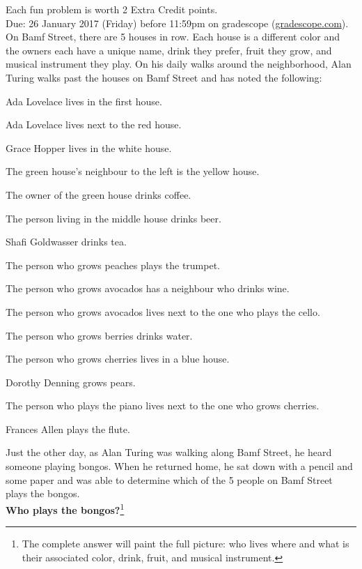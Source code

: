 \documentclass{article}
\theoremstyle{definition}
\begin{document}
\noindent
Each fun problem is worth 2 Extra Credit points.\\
Due: 26 January 2017 (Friday) before 11:59pm on gradescope (\url{gradescope.com}).\\

\noindent
On Bamf Street, there are 5 houses in row.  Each house is a different color and the owners each have a unique name, drink they prefer, fruit they grow, and musical instrument they play.  On his daily walks around the neighborhood, Alan Turing walks past the houses on Bamf Street and has noted the following:
\begin{compactitem}
\item Ada Lovelace lives in the first house.
\item Ada Lovelace lives next to the red house.
\item Grace Hopper lives in the white house.
\item The green house's neighbour to the left is the yellow house.
\item The owner of the green house drinks coffee.
\item The person living in the middle house drinks beer.
\item Shafi Goldwasser drinks tea.
\item The person who grows peaches plays the trumpet.
\item The person who grows avocados has a neighbour who drinks wine.
\item The person who grows avocados lives next to the one who plays the cello.
\item The person who grows berries drinks water.
\item The person who grows cherries lives in a blue house.
\item Dorothy Denning grows pears.
\item The person who plays the piano lives next to the one who grows cherries.
\item Frances Allen plays the flute.
\end{compactitem}
Just the other day, as Alan Turing was walking along Bamf Street, he heard someone playing bongos.  When he returned home, he sat down with a pencil and some paper and was able to determine which of the 5 people on Bamf Street plays the bongos.\\
\textbf{Who plays the bongos?}\footnote{The complete answer will paint the full picture: who lives where and what is their associated color, drink, fruit, and musical instrument.}
\newline
\newline
\end{document}
